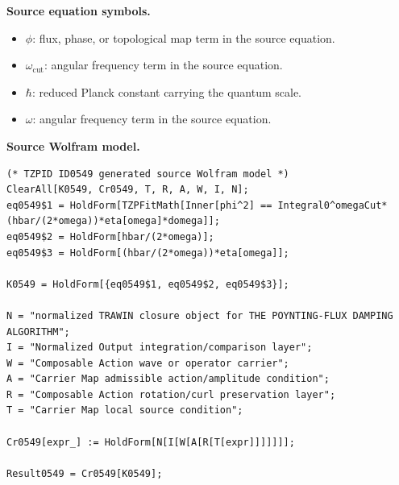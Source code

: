 \begin{minipage}[t]{0.49\linewidth}
\begingroup
\small
\raggedright
\textbf{Source equation symbols.}\par
\begin{itemize}[leftmargin=1.35em,itemsep=1pt,topsep=1pt,parsep=0pt]
    \item $\phi$: flux, phase, or topological map term in the source equation.
    \item $\omega_{\mathrm{cut}}$: angular frequency term in the source equation.
    \item $\hbar$: reduced Planck constant carrying the quantum scale.
    \item $\omega$: angular frequency term in the source equation.
\end{itemize}
\endgroup
\end{minipage}\hfill
\begin{minipage}[t]{0.47\linewidth}
\begingroup
\scriptsize
\raggedright
\textbf{Source Wolfram model.}\par
\begin{Verbatim}[fontsize=\tiny,breaklines=true,breakanywhere=true]
(* TZPID ID0549 generated source Wolfram model *)
ClearAll[K0549, Cr0549, T, R, A, W, I, N];
eq0549$1 = HoldForm[TZPFitMath[Inner[phi^2] == Integral0^omegaCut*(hbar/(2*omega))*eta[omega]*domega]];
eq0549$2 = HoldForm[hbar/(2*omega)];
eq0549$3 = HoldForm[(hbar/(2*omega))*eta[omega]];

K0549 = HoldForm[{eq0549$1, eq0549$2, eq0549$3}];

N = "normalized TRAWIN closure object for THE POYNTING-FLUX DAMPING ALGORITHM";
I = "Normalized Output integration/comparison layer";
W = "Composable Action wave or operator carrier";
A = "Carrier Map admissible action/amplitude condition";
R = "Composable Action rotation/curl preservation layer";
T = "Carrier Map local source condition";

Cr0549[expr_] := HoldForm[N[I[W[A[R[T[expr]]]]]]];

Result0549 = Cr0549[K0549];
\end{Verbatim}
\endgroup
\end{minipage}

